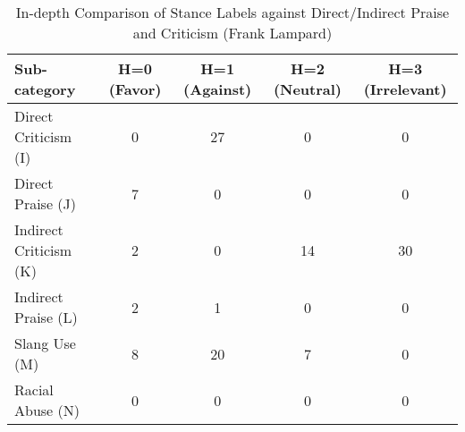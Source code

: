 \documentclass{article}
\begin{document}
\begin{table}[htbp] %
    \centering %
    \caption{In-depth Comparison of Stance Labels against Direct/Indirect Praise and Criticism (Frank Lampard)} %
    \label{tab:statistical_summary_h} %
    \renewcommand{\arraystretch}{1.2} %
    \begin{adjustbox}{max width=\linewidth} %
        \begin{tabular}{l c c c c} %
            \toprule %
            \textbf{Sub-category} & \textbf{H=0 (Favor)} & \textbf{H=1 (Against)} & \textbf{H=2 (Neutral)} & \textbf{H=3 (Irrelevant)} \\ %
            \midrule %
            Direct Criticism (I)  & 0 & 27 & 0  & 0 \\
            Direct Praise (J)     & 7 & 0  & 0  & 0 \\
            Indirect Criticism (K) & 2 & 0  & 14 & 30 \\ %
            Indirect Praise (L)   & 2 & 1  & 0  & 0 \\
            Slang Use (M)         & 8 & 20 & 7  & 0 \\ %
            Racial Abuse (N)      & 0 & 0  & 0  & 0 \\
            \bottomrule %
        \end{tabular}
    \end{adjustbox}
\end{table}
\end{document}
